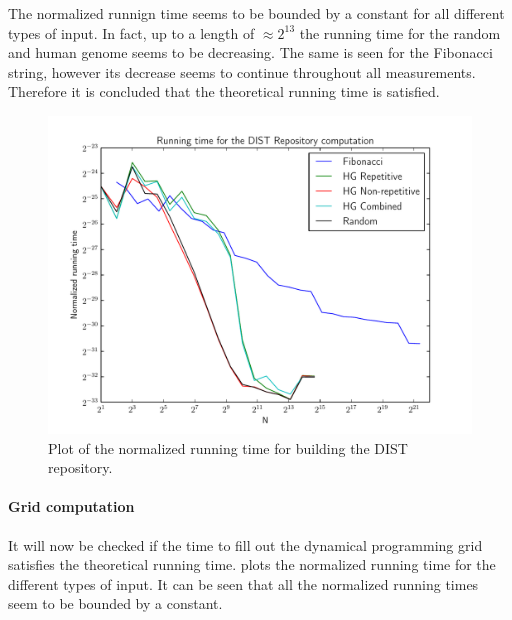 \documentclass[twoside,11pt,openright]{report}
\begin{document}
The normalized runnign time seems to be bounded by a constant for all different types of input. In fact, up to a length of $\approx 2^{13}$ the running time for the random and human genome seems to be decreasing. The same is seen for the Fibonacci string, however its decrease seems to continue throughout all measurements.
Therefore it is concluded that the theoretical running time is satisfied.

\begin{figure}[!htb]
  \centering
  \includegraphics[width=11.3cm]{combined/dist_runningtime}
  \caption{Plot of the normalized running time for building the DIST repository.}
  \label{fig:benchmark:dist-repo-time}
\end{figure}


\clearpage
\paragraph{Grid computation}
It will now be checked if the time to fill out the dynamical programming grid satisfies the theoretical running time.  plots the normalized running time for the different types of input. It can be seen that all the normalized running times seem to be bounded by a constant.
\end{document}
